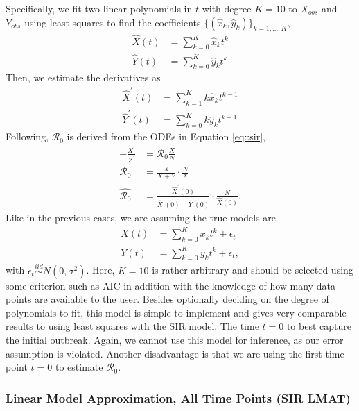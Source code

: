 \documentclass[12pt]{article}
\newcommand{\rr}{\ensuremath{\mathcal{R}_0}}
\begin{document}
Specifically, we fit two linear polynomials in \(t\) with degree \(K= 10\) to \(X_{obs}\)
and \(Y_{obs}\) using least squares to find the coefficients $\{(\hat{x}_k,
\hat{y}_k)\}_{k=1, \dots, K}$,
\begin{align*}
\hat{X}(t) &= \sum_{k=0}^K \hat{x}_k t^k\\
{\hat{Y}}(t) &= \sum_{k=0}^K \hat{y}_k t^k
\end{align*}
Then, we estimate the derivatives as
\begin{align*}
\hat{X}^\prime(t) &= \sum_{k=1}^K k \hat{x}_k t^{k-1}\\
\hat{Y}^\prime(t) &= \sum_{k=0}^K k \hat{y}_k t^{k-1}
\end{align*}
Following,  \(\rr\) is derived from the ODEs in Equation \eqref{eq::sir},
\begin{align}
  - \frac{X^\prime}{Z^\prime}&= \rr \frac{X}{N} \nonumber\\
\rr &=       \frac{X}{ X + Y} \cdot \frac{N}{X} \nonumber\\
  \hat{\rr} &= \frac{\hat{X}^\prime(0)}{ \hat{X}^\prime(0) + \hat{Y}^\prime(0)} \cdot \frac{N}{\hat{X}(0)}. \nonumber
  \end{align}
Like in the previous cases, we are assuming the true models are
\begin{align*}
X(t) &= \sum_{k=0}^K x_k t^k + \epsilon_t\\
  {Y}(t) &= \sum_{k=0}^K y_k t^k + \epsilon_t,
\end{align*}
with $\epsilon_t \overset{iid}{\sim} N(0, \sigma^2)$.  Here, $K=10$ is rather arbitrary and should be selected using some criterion such as AIC in addition with the knowledge of how many data points are available to the user.  Besides optionally deciding on the degree of polynomials to fit, this model is simple to implement and gives very comparable results to using least squares with the SIR model.  The time $t=0$ to best capture the initial outbreak.  Again, we cannot use this model for inference, as our error assumption is violated.  Another disadvantage is that we are using the first time point $t=0$ to estimate $\rr$.  

\subsubsection{Linear Model Approximation, All Time Points (SIR LMAT)}\label{linear-model-approximation-all-time-points-degree-10}
\end{document}
